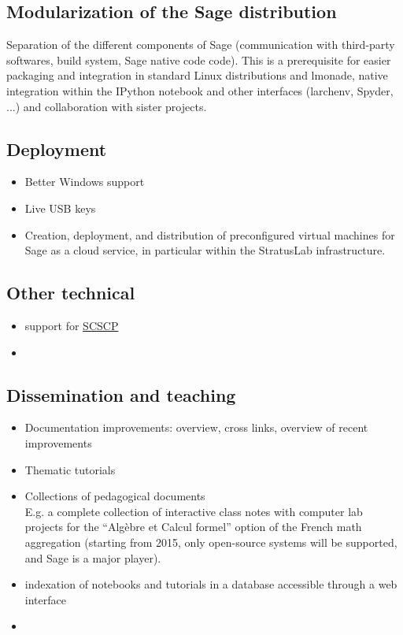 \subsection{Modularization of the Sage distribution}
Separation of the different components of Sage (communication with third-party softwares, build system, Sage native code code). This is a prerequisite for easier packaging and integration in standard Linux distributions and lmonade, native integration within the IPython notebook and other interfaces (larchenv, Spyder, ...) and collaboration with sister projects.

\subsection{Deployment}
\begin{itemize}
\item Better Windows support
\item Live USB keys
\item Creation, deployment, and distribution of preconfigured virtual
machines for Sage as a cloud service, in particular within the
StratusLab infrastructure.
\end{itemize}

\subsection{Other technical}

\begin{itemize}
\item support for \href{http://www.symbolic-computing.org/}{SCSCP}
\item {}
\end{itemize}

\subsection{Dissemination and teaching}

\begin{itemize}
\item Documentation improvements: overview, cross links, overview of
  recent improvements
\item Thematic tutorials
\item Collections of pedagogical documents\\
  E.g. a complete collection of interactive class notes with computer
  lab projects for the ``Algèbre et Calcul formel'' option of the
  French math aggregation (starting from 2015, only open-source
  systems will be supported, and Sage is a major player).
\item indexation of notebooks and tutorials in a database accessible through a
  web interface
\item {}
\end{itemize}

